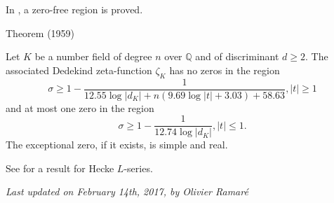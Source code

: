 In
\cite{Kadiri*12},
a zero-free region is proved.

\par 
\begin{thm}{Theorem (1959)}

Let $K$ be a number field of degree $n$ over $\mathbb{Q}$ and of
discriminant $d \ge 2$. The associated Dedekind
zeta-function $\zeta_K$ has no zeros in the region
$$
\sigma\ge 1-\frac{1}{12.55\log|d_K|+n(9.69\log|t|+3.03)+58.63}, |t|\ge1
$$
and at most one zero in the region
$$
\sigma\ge 1-\frac{1}{12.74\log|d_K|}, |t|\le 1.
$$
The exceptional zero, if it exists, is simple and real.
\end{thm}

See
\cite{Ahn-Kwon*14}
for a result for Hecke $L$-series.









  
\begin{flushright}\small\sl{}   Last updated on February 14th, 2017, by Olivier Ramar\'e
 \end{flushright}














